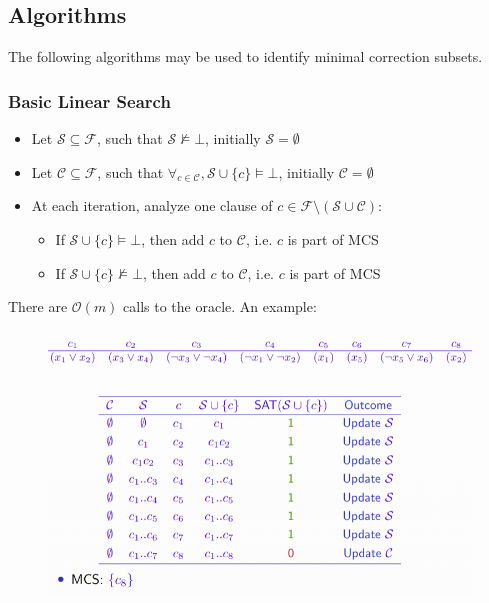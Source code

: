 \documentclass[10pt,a4paper]{report}
\begin{document}
\subsection{Algorithms}
The following algorithms may be used to identify minimal correction subsets.
\subsubsection{Basic Linear Search}
\begin{itemize}
    \item Let $\mathcal{S} \subseteq \mathcal{F}$, such that $\mathcal{S}\nvDash \bot$, initially $\mathcal{S} = \emptyset$
    \item Let $\mathcal{C} \subseteq \mathcal{F}$, such that $\forall_{c \in \mathcal{C}}, \mathcal{S} \cup \{c\} \vDash \bot $, initially $\mathcal{C} = \emptyset$
    \item At each iteration, analyze one clause of $c \in \mathcal{F} \setminus (\mathcal{S} \cup \mathcal{C})$:
    \begin{itemize}
        \item If $\mathcal{S} \cup \{c\} \vDash \bot$, then add $c$ to $\mathcal{C}$, i.e. $c$ is part of MCS
        \item If $\mathcal{S} \cup \{c\} \nvDash \bot$, then add $c$ to $\mathcal{C}$, i.e. $c$ is part of MCS
    \end{itemize}
\end{itemize}
There are $\mathcal{O}(m)$ calls to the oracle. An example:
\begin{figure}[H]
    \centering
    \includegraphics[scale=0.4]{15.png}
\end{figure}
\end{document}
